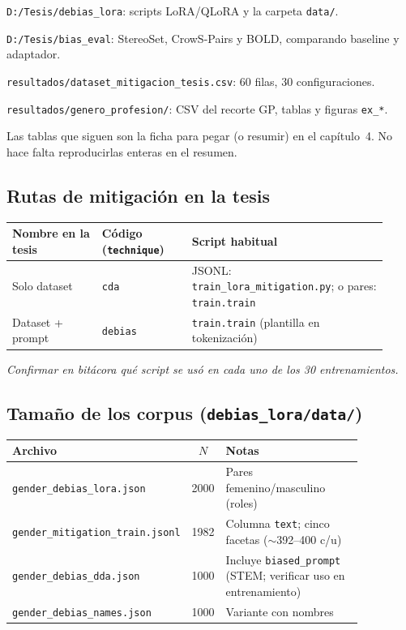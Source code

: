 \documentclass[11pt,a4paper]{article}
\newcommand{\archivo}[1]{\texttt{\nolinkurl{#1}}}
\begin{document}
\begin{description}[leftmargin=2.4cm, style=nextline, itemsep=0.3em]
  \item[Entrenamiento]
        \archivo{D:/Tesis/debias\_lora}: scripts LoRA/QLoRA y la carpeta \archivo{data/}.
  \item[Evaluación]
        \archivo{D:/Tesis/bias\_eval}: StereoSet, CrowS-Pairs y BOLD, comparando baseline y adaptador.
  \item[Tabla maestra]
        \archivo{resultados/dataset\_mitigacion\_tesis.csv}: 60 filas, 30 configuraciones.
  \item[Lo que cita el cap.~5]
        \archivo{resultados/genero\_profesion/}: CSV del recorte GP, tablas y figuras \texttt{ex\_*}.
\end{description}

Las tablas que siguen son la ficha para pegar (o resumir) en el capítulo~4. No hace falta reproducirlas
enteras en el resumen.

\subsection{Rutas de mitigación en la tesis}

\begin{tabularx}{\linewidth}{@{}L{0.22\linewidth}L{0.22\linewidth}L{0.48\linewidth}@{}}
\toprule
\textbf{Nombre en la tesis} & \textbf{Código (\texttt{technique})} & \textbf{Script habitual} \\
\midrule
Solo dataset & \texttt{cda} & JSONL: \archivo{train\_lora\_mitigation.py}; o pares: \archivo{train.train} \\
Dataset + prompt & \texttt{debias} & \archivo{train.train} (plantilla en tokenización) \\
\bottomrule
\end{tabularx}

\smallskip
\noindent\textit{Confirmar en bitácora qué script se usó en cada uno de los 30 entrenamientos.}

\subsection[Tamaño de los corpus]{Tamaño de los corpus (\archivo{debias\_lora/data/})}

\begin{tabularx}{\linewidth}{@{}L{0.42\linewidth}cL{0.44\linewidth}@{}}
\toprule
\textbf{Archivo} & \textbf{$N$} & \textbf{Notas} \\
\midrule
\archivo{gender\_debias\_lora.json} & 2000 & Pares femenino/masculino (roles) \\
\archivo{gender\_mitigation\_train.jsonl} & 1982 & Columna \texttt{text}; cinco facetas ($\sim$392--400 c/u) \\
\archivo{gender\_debias\_dda.json} & 1000 & Incluye \texttt{biased\_prompt} (STEM; verificar uso en entrenamiento) \\
\archivo{gender\_debias\_names.json} & 1000 & Variante con nombres \\
\bottomrule
\end{tabularx}
\end{document}
